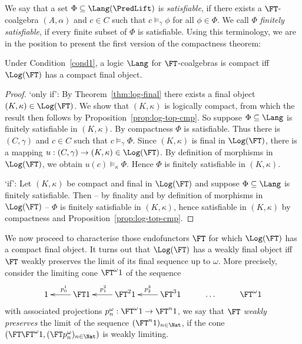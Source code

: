\documentclass{entcs}
\begin{document}
We say that a set $\Phi \subseteq \Lang(\PredLift)$ is \emph{satisfiable}, if
there exists a $\FT$-coalgebra $(A,\alpha)$ and $c \in C$ such that $c
\models_{\gamma} \phi$ for all $\phi \in \Phi$. We call $\Phi$ \emph{finitely
satisfiable}, if every finite subset of $\Phi$ is satisfiable. Using this
terminology, we are in the position to present the first version of the
compactness theorem:

\begin{thm}
  Under Condition~\ref{cond1}, a logic $\Lang$ for $\FT$-coalgebras is compact
  iff $\Log(\FT)$ has a compact final object.
\end{thm}
%
\begin{proof}
  `only if': By Theorem~\ref{thm:log-final} there exists a final object $(K,
  \kappa) \in \Log(\FT)$. We show that $(K, \kappa)$ is logically compact,
  from which the result then follows by
  Proposition~\ref{prop:log-top-cmp}.  So suppose $\Phi \subseteq \Lang$
  is finitely satisfiable in $(K, \kappa)$. By compactness $\Phi$ is
  satisfiable. Thus there is $(C, \gamma)$ and $c \in C$ such that $c
  \models_{\gamma} \Phi$. Since $(K, \kappa)$ is final in $\Log(\FT)$, there
  is a mapping $u: (C, \gamma) \to (K, \kappa) \in \Log(\FT)$. By definition
  of morphisms in $\Log(\FT)$, we obtain $u(c) \models_{\kappa} \Phi$. Hence
  $\Phi$ is finitely satisfiable in $(K, \kappa)$.
  
  `if': Let $(K, \kappa)$ be compact and final in $\Log(\FT)$ and suppose
  $\Phi \subseteq \Lang$ is finitely satisfiable. Then -- by finality and by
  definition of morphisms in $\Log(\FT)$ -- $\Phi$ is finitely satisfiable in
  $(K, \kappa)$, hence satisfiable in $(K, \kappa)$ by compactness and
  Proposition~\ref{prop:log-top-cmp}.
\end{proof}

We now proceed to characterise those endofunctors $\FT$ for which
$\Log(\FT)$ has a compact final object. It turns out that $\Log(\FT)$
has a weakly final object iff $\FT$ weakly preserves the limit of its
final sequence up to $\omega$. More precisely, consider the limiting
cone $\FT^{\omega} 1$ of the sequence
%
\[\xymatrix{
  1 & \FT 1 \ar[l]_{p^1_0} & \FT^2 1 \ar[l]_{p^2_1} & \FT^3 1 \ar[l]_{p^3_2} &
  \dots & \FT^\omega 1 }
\] 
%
with associated projections $p^\omega_n: \FT^{\omega} 1 \to \FT^n 1$, we say that $\FT$
\emph{weakly preserves} the limit of the sequence $(\FT^n 1)_{n \in \Nat}$, if
the cone $(\FT \FT^{\omega} 1, (\FT p^\omega_n)_{n \in \Nat})$ is weakly limiting.
\end{document}
